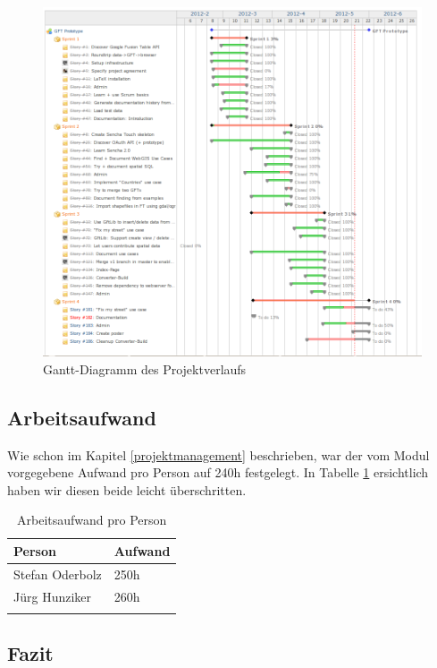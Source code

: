\begin{figure}[H]
	\centering
	\includegraphics[scale=0.5]{images/projektmanagement/overall_stories_gantt_chart}
	\caption{Gantt-Diagramm des Projektverlaufs}
	\label{overall_stories_gantt_chart}
\end{figure}

\subsection{Arbeitsaufwand}
Wie schon im Kapitel \ref{projektmanagement} beschrieben, war der vom Modul vorgegebene Aufwand pro Person auf 240h festgelegt. In Tabelle \ref{projektmanagement-arbeitsaufwand} ersichtlich haben wir diesen beide leicht überschritten.

\begin{longtable}{|l|l|}
\hline 
\textbf{Person} & \textbf{Aufwand} \\ 
\hline 
Stefan Oderbolz & 250h \\ 
\hline 
Jürg Hunziker & 260h \\ 
\hline 
\caption{Arbeitsaufwand pro Person}
\label{projektmanagement-arbeitsaufwand}
\end{longtable} 

\subsection{Fazit}
